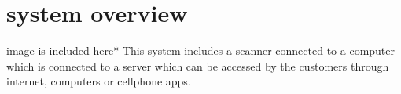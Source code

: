 \section{system overview}
image is included here*
This system includes a scanner connected to a computer which is connected to a server which can be accessed by the customers through internet, computers or cellphone apps.
